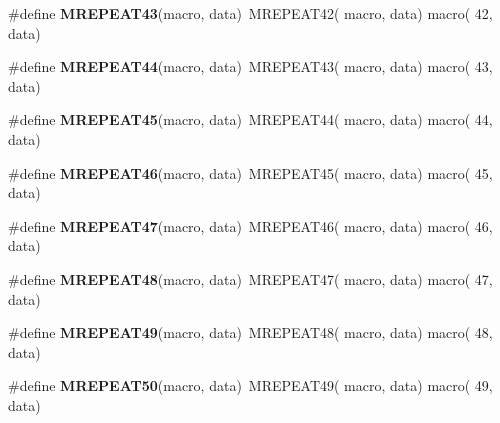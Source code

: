\begin{DoxyCompactItemize}
\item 
\hypertarget{group__group__xmega__utils__mrepeat_ga1e33b119c4bd161e0262399c67ccc6c8}{\#define {\bfseries M\-R\-E\-P\-E\-A\-T43}(macro, data)~M\-R\-E\-P\-E\-A\-T42( macro, data)   macro( 42, data)}\label{group__group__xmega__utils__mrepeat_ga1e33b119c4bd161e0262399c67ccc6c8}

\item 
\hypertarget{group__group__xmega__utils__mrepeat_ga2b24fe07a9548203e922430255d5dba1}{\#define {\bfseries M\-R\-E\-P\-E\-A\-T44}(macro, data)~M\-R\-E\-P\-E\-A\-T43( macro, data)   macro( 43, data)}\label{group__group__xmega__utils__mrepeat_ga2b24fe07a9548203e922430255d5dba1}

\item 
\hypertarget{group__group__xmega__utils__mrepeat_ga98af56829d52d667c77077948d324447}{\#define {\bfseries M\-R\-E\-P\-E\-A\-T45}(macro, data)~M\-R\-E\-P\-E\-A\-T44( macro, data)   macro( 44, data)}\label{group__group__xmega__utils__mrepeat_ga98af56829d52d667c77077948d324447}

\item 
\hypertarget{group__group__xmega__utils__mrepeat_gaaa292eca5c75fc09e042a941b69e077c}{\#define {\bfseries M\-R\-E\-P\-E\-A\-T46}(macro, data)~M\-R\-E\-P\-E\-A\-T45( macro, data)   macro( 45, data)}\label{group__group__xmega__utils__mrepeat_gaaa292eca5c75fc09e042a941b69e077c}

\item 
\hypertarget{group__group__xmega__utils__mrepeat_ga31b4cab8f91fc3ca6dbb6d4d501edc3c}{\#define {\bfseries M\-R\-E\-P\-E\-A\-T47}(macro, data)~M\-R\-E\-P\-E\-A\-T46( macro, data)   macro( 46, data)}\label{group__group__xmega__utils__mrepeat_ga31b4cab8f91fc3ca6dbb6d4d501edc3c}

\item 
\hypertarget{group__group__xmega__utils__mrepeat_ga37c9d35afe9f5aa1eb274a590afeae75}{\#define {\bfseries M\-R\-E\-P\-E\-A\-T48}(macro, data)~M\-R\-E\-P\-E\-A\-T47( macro, data)   macro( 47, data)}\label{group__group__xmega__utils__mrepeat_ga37c9d35afe9f5aa1eb274a590afeae75}

\item 
\hypertarget{group__group__xmega__utils__mrepeat_ga0b8f49d449884ed9753850305fd1e31f}{\#define {\bfseries M\-R\-E\-P\-E\-A\-T49}(macro, data)~M\-R\-E\-P\-E\-A\-T48( macro, data)   macro( 48, data)}\label{group__group__xmega__utils__mrepeat_ga0b8f49d449884ed9753850305fd1e31f}

\item 
\hypertarget{group__group__xmega__utils__mrepeat_gac25633a97dd40a5eec980d04c51d960d}{\#define {\bfseries M\-R\-E\-P\-E\-A\-T50}(macro, data)~M\-R\-E\-P\-E\-A\-T49( macro, data)   macro( 49, data)}\label{group__group__xmega__utils__mrepeat_gac25633a97dd40a5eec980d04c51d960d}


\end{DoxyCompactItemize}
